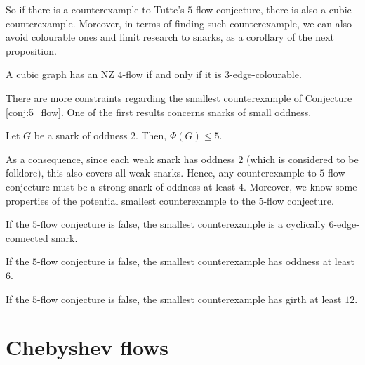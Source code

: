 So if there is a counterexample to Tutte's $5$-flow conjecture, there is also a cubic counterexample. Moreover, in terms of finding such counterexample, we can also avoid colourable ones and limit research to snarks, as a corollary of the next proposition.

\begin{proposition} \emph{\cite[pp. 160, 161]{diestel}}
A cubic graph has an NZ $4$-flow if and only if it is $3$-edge-colourable.
\end{proposition}

There are more constraints regarding the smallest counterexample of Conjecture \ref{conj:5_flow}. One of the first results concerns snarks of small oddness.

\begin{theorem} \emph{\cite[p. 89]{nearly_f4}}
Let $G$ be a snark of oddness $2$. Then, $\Phi(G)\leq 5$. \label{th:oddness_1D}
\end{theorem}

As a consequence, since each weak snark has oddness $2$ (which is considered to be folklore), this also covers all weak snarks. Hence, any counterexample to $5$-flow conjecture must be a strong snark of oddness at least $4$. Moreover, we know some properties of the potential smallest counterexample to the $5$-flow conjecture.

\begin{theorem} \emph{\cite[p. 142]{min_ctrex_cyc_edge_con}}
If the $5$-flow conjecture is false, the smallest counterexample is a cyclically $6$-edge-connected snark.
\end{theorem}

\begin{theorem} \emph{\cite[p. 364]{oddness_4}}
If the $5$-flow conjecture is false, the smallest counterexample has oddness at least $6$.
\end{theorem}

\begin{theorem} \emph{\cite[p. 15]{min_ctrex_girth}}
If the $5$-flow conjecture is false, the smallest counterexample has girth at least $12$.
\end{theorem}

\section{Chebyshev flows}

